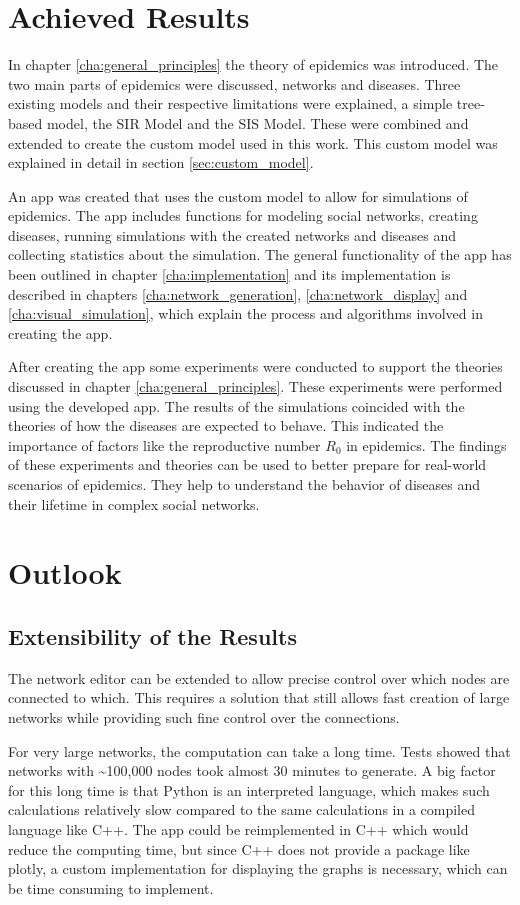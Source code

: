 \section{Achieved Results}
In chapter \ref{cha:general_principles} the theory of epidemics was introduced. The two main parts of epidemics were discussed, networks and diseases. Three existing models and their respective limitations were explained, a simple tree-based model, the SIR Model and the SIS Model. These were  combined and extended to create the custom model used in this work. This custom model was explained in detail in section \ref{sec:custom_model}.

An app was created that uses the custom model to allow for simulations of epidemics. The app includes functions for modeling social networks, creating diseases, running simulations with the created networks and diseases and collecting statistics about the simulation. The general functionality of the app has been outlined in chapter \ref{cha:implementation} and its implementation is described in chapters \ref{cha:network_generation}, \ref{cha:network_display} and \ref{cha:visual_simulation}, which explain the process and algorithms involved in creating the app.

After creating the app some experiments were conducted to support the theories discussed in chapter \ref{cha:general_principles}. These experiments were performed using the developed app. The results of the simulations coincided with the theories of how the diseases are expected to behave. This indicated the importance of factors like the reproductive number $R_0$ in epidemics. The findings of these experiments and theories can be used to better prepare for real-world scenarios of epidemics. They help to understand the behavior of diseases and their lifetime in complex social networks.

\section{Outlook}
\subsection{Extensibility of the Results}
The network editor can be extended to allow precise control over which nodes are connected to which. This requires a solution that still allows fast creation of large networks while providing such fine control over the connections.

For very large networks, the computation can take a long time. Tests showed that networks with \textasciitilde  100,000 nodes took almost 30 minutes to generate. A big factor for this long time is that Python is an interpreted language, which makes such calculations relatively slow compared to the same calculations in a compiled language like C++. The app could be reimplemented in C++ which would reduce the computing time, but since C++ does not provide a package like plotly, a custom implementation for displaying the graphs is necessary, which can be time consuming to implement.

